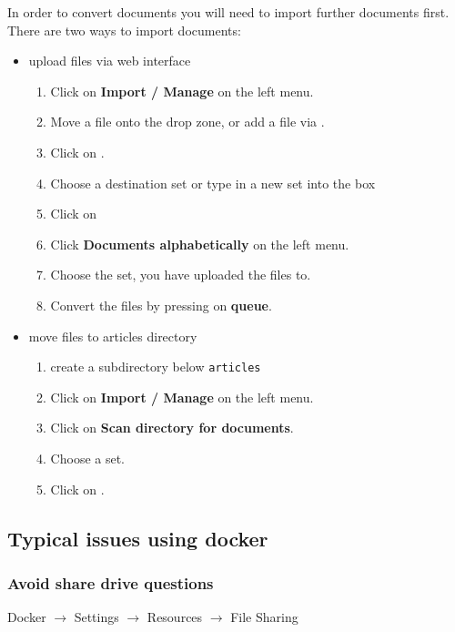 \documentclass[a4paper]{article}
\begin{document}
In order to convert documents you will need to import further documents first.
There are two ways to import documents:
\begin{itemize}
\item{upload files via web interface}
\begin{enumerate}
	\item Click on \textbf{Import / Manage} on the left menu.
	\item Move a file onto the drop zone, or add a file via .
	\item Click on .
	\item Choose a destination set or type in a new set into the box
	\item Click on 
	\item Click \textbf{Documents alphabetically} on the left menu. 
	\item Choose the set, you have uploaded the files to. 
	\item Convert the files by pressing on \textbf{queue}.
\end{enumerate}	 
	
\item{move files to articles directory}
\begin{enumerate}
   \item create a subdirectory below \texttt{articles}
   \item Click on \textbf{Import / Manage} on the left menu.
   \item Click on \textbf{Scan directory for documents}.
   \item Choose a set.
	\item Click on .
\end{enumerate}	 
   
\end{itemize}

\subsection{Typical issues using docker}

\subsubsection{Avoid share drive questions}
Docker $\rightarrow$ Settings $\rightarrow$ Resources $\rightarrow$ File Sharing
\end{document}
